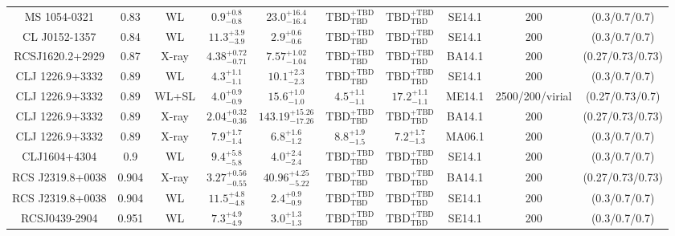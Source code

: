 \begin{table}
\begin{tabular}{cccccccccc}
MS 1054-0321 & 0.83 & WL & ${0.9}^{+0.8}_{-0.8}$ & ${23.0}^{+16.4}_{-16.4}$ & ${\mathrm{TBD}}^{+\mathrm{TBD}}_{\mathrm{TBD}}$ & ${\mathrm{TBD}}^{+\mathrm{TBD}}_{\mathrm{TBD}}$ & SE14.1 & 200 & (0.3/0.7/0.7) \\
CL J0152-1357 & 0.84 & WL & ${11.3}^{+3.9}_{-3.9}$ & ${2.9}^{+0.6}_{-0.6}$ & ${\mathrm{TBD}}^{+\mathrm{TBD}}_{\mathrm{TBD}}$ & ${\mathrm{TBD}}^{+\mathrm{TBD}}_{\mathrm{TBD}}$ & SE14.1 & 200 & (0.3/0.7/0.7) \\
RCSJ1620.2+2929 & 0.87 & X-ray & ${4.38}^{+0.72}_{-0.71}$ & ${7.57}^{+1.02}_{-1.04}$ & ${\mathrm{TBD}}^{+\mathrm{TBD}}_{\mathrm{TBD}}$ & ${\mathrm{TBD}}^{+\mathrm{TBD}}_{\mathrm{TBD}}$ & BA14.1 & 200 & (0.27/0.73/0.73) \\
CLJ 1226.9+3332 & 0.89 & WL & ${4.3}^{+1.1}_{-1.1}$ & ${10.1}^{+2.3}_{-2.3}$ & ${\mathrm{TBD}}^{+\mathrm{TBD}}_{\mathrm{TBD}}$ & ${\mathrm{TBD}}^{+\mathrm{TBD}}_{\mathrm{TBD}}$ & SE14.1 & 200 & (0.3/0.7/0.7) \\
CLJ 1226.9+3332 & 0.89 & WL+SL & ${4.0}^{+0.9}_{-0.9}$ & ${15.6}^{+1.0}_{-1.0}$ & ${4.5}^{+1.1}_{-1.1}$ & ${17.2}^{+1.1}_{-1.1}$ & ME14.1 & 2500/200/virial & (0.27/0.73/0.7) \\
CLJ 1226.9+3332 & 0.89 & X-ray & ${2.04}^{+0.32}_{-0.36}$ & ${143.19}^{+15.26}_{-17.26}$ & ${\mathrm{TBD}}^{+\mathrm{TBD}}_{\mathrm{TBD}}$ & ${\mathrm{TBD}}^{+\mathrm{TBD}}_{\mathrm{TBD}}$ & BA14.1 & 200 & (0.27/0.73/0.73) \\
CLJ 1226.9+3332 & 0.89 & X-ray & ${7.9}^{+1.7}_{-1.4}$ & ${6.8}^{+1.6}_{-1.2}$ & ${8.8}^{+1.9}_{-1.5}$ & ${7.2}^{+1.7}_{-1.3}$ & MA06.1 & 200 & (0.3/0.7/0.7) \\
CLJ1604+4304 & 0.9 & WL & ${9.4}^{+5.8}_{-5.8}$ & ${4.0}^{+2.4}_{-2.4}$ & ${\mathrm{TBD}}^{+\mathrm{TBD}}_{\mathrm{TBD}}$ & ${\mathrm{TBD}}^{+\mathrm{TBD}}_{\mathrm{TBD}}$ & SE14.1 & 200 & (0.3/0.7/0.7) \\
RCS J2319.8+0038 & 0.904 & X-ray & ${3.27}^{+0.56}_{-0.55}$ & ${40.96}^{+4.25}_{-5.22}$ & ${\mathrm{TBD}}^{+\mathrm{TBD}}_{\mathrm{TBD}}$ & ${\mathrm{TBD}}^{+\mathrm{TBD}}_{\mathrm{TBD}}$ & BA14.1 & 200 & (0.27/0.73/0.73) \\
RCS J2319.8+0038 & 0.904 & WL & ${11.5}^{+4.8}_{-4.8}$ & ${2.4}^{+0.9}_{-0.9}$ & ${\mathrm{TBD}}^{+\mathrm{TBD}}_{\mathrm{TBD}}$ & ${\mathrm{TBD}}^{+\mathrm{TBD}}_{\mathrm{TBD}}$ & SE14.1 & 200 & (0.3/0.7/0.7) \\
RCSJ0439-2904 & 0.951 & WL & ${7.3}^{+4.9}_{-4.9}$ & ${3.0}^{+1.3}_{-1.3}$ & ${\mathrm{TBD}}^{+\mathrm{TBD}}_{\mathrm{TBD}}$ & ${\mathrm{TBD}}^{+\mathrm{TBD}}_{\mathrm{TBD}}$ & SE14.1 & 200 & (0.3/0.7/0.7) \\

\end{tabular}
\end{table}
